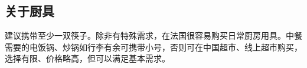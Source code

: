 \subsection{关于厨具}
建议携带至少一双筷子。除非有特殊需求，在法国很容易购买日常厨房用具。中餐需要的电饭锅、炒锅如行李有余可携带小号，否则可在中国超市、线上超市购买，选择有限、价格略高，但可以满足基本需求。
